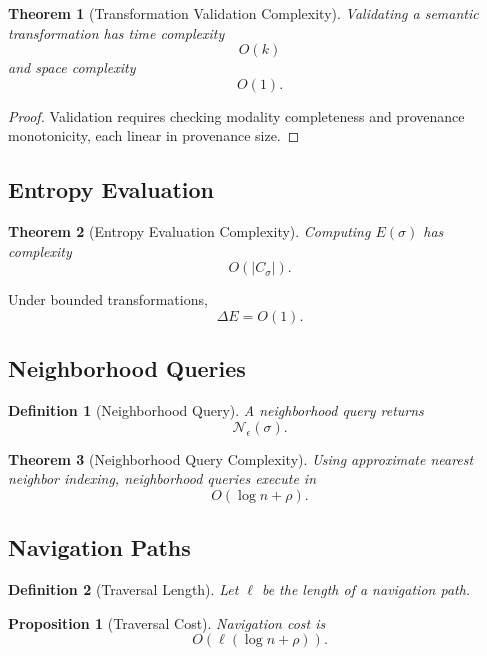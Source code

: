 \documentclass[11pt]{article}
\newtheorem{definition}{Definition}
\newtheorem{proposition}{Proposition}
\newtheorem{theorem}{Theorem}
\begin{document}
\begin{theorem}[Transformation Validation Complexity]
Validating a semantic transformation has time complexity
\[
O(k)
\]
and space complexity
\[
O(1).
\]
\end{theorem}

\begin{proof}
Validation requires checking modality completeness and provenance monotonicity, each linear
in provenance size.
\end{proof}


\subsection{Entropy Evaluation}

\begin{theorem}[Entropy Evaluation Complexity]
Computing $E(\sigma)$ has complexity
\[
O(|C_\sigma|).
\]
\end{theorem}

\begin{corollary}
Under bounded transformations,
\[
\Delta E = O(1).
\]
\end{corollary}

\subsection{Neighborhood Queries}

\begin{definition}[Neighborhood Query]
A neighborhood query returns
\[
\mathcal{N}_\epsilon(\sigma).
\]
\end{definition}

\begin{theorem}[Neighborhood Query Complexity]
Using approximate nearest neighbor indexing, neighborhood queries execute in
\[
O(\log n + \rho).
\]
\end{theorem}

\subsection{Navigation Paths}

\begin{definition}[Traversal Length]
Let $\ell$ be the length of a navigation path.
\end{definition}

\begin{proposition}[Traversal Cost]
Navigation cost is
\[
O(\ell(\log n + \rho)).
\]
\end{proposition}
\end{document}
